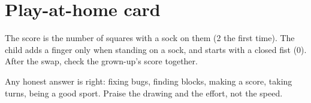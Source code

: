 \section{Play-at-home card}
\begin{answer}
The score is the number of squares with a sock on them (2 the first time). The child adds a finger only when standing on a sock, and starts with a closed fist (0). After the swap, check the grown-up's score together.
\end{answer}

\begin{answer}
Any honest answer is right: fixing bugs, finding blocks, making a score, taking turns, being a good sport. Praise the drawing and the effort, not the speed.
\end{answer}
